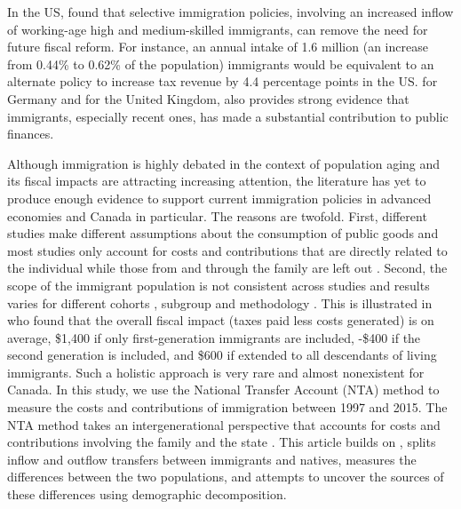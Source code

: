 \vspace{0.7em}\par
In the US, \citet{Storesletten:2000cn} found that selective immigration policies, involving an increased inflow of working-age high and medium-skilled immigrants, can remove the need for future fiscal reform.
For instance, an annual intake of 1.6 million (an increase from 0.44\% to 0.62\% of the population) immigrants would be equivalent to an alternate policy to increase tax revenue by 4.4 percentage points in the US.
\citet{Akin:2012gh} for Germany and \citet{Dustmann:2014dr} for the United Kingdom, also provides strong evidence that immigrants, especially recent ones, has made a substantial contribution to public finances.

\vspace{0.7em}\par
Although immigration is highly debated in the context of population aging and its fiscal impacts are attracting increasing attention, the literature has yet to produce enough evidence to support current immigration policies in advanced economies and Canada in particular.
The reasons are twofold.
First, different studies make different assumptions about the consumption of public goods \citep{Grubel:2012wo} and most studies only account for costs and contributions that are directly related to the individual while those from and through the family are left out \citep{dAlbis:2019de}.
Second, the scope of the immigrant population is not consistent across studies and results varies for different cohorts \citep{Grubel:2012wo}, subgroup and methodology \citep{Chojnicki:2011vu}.
This is illustrated in \citet{Lee:1998fs} who found that the overall fiscal impact (taxes paid less costs generated) is on average, \$1,400 if only first-generation immigrants are included, -\$400 if the second generation is included, and  \$600 if extended to all descendants of living immigrants.
Such a holistic approach is very rare and almost nonexistent for Canada.
In this study, we use the National Transfer Account (NTA) method to measure the costs and contributions of immigration between 1997 and 2015.
The NTA method takes an intergenerational perspective that accounts for costs and contributions involving the family and the state \citep{Mason:2011wc,UnitedNations:2013vz}.
This article builds on \citet{Merette:2019kz}, splits inflow and outflow transfers between immigrants and natives, measures the differences between the two populations, and attempts to uncover the sources of these differences using demographic decomposition.

